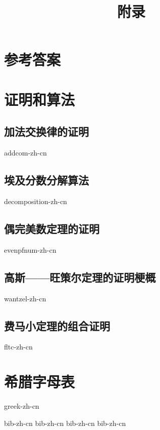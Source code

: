 \documentclass[b5paper]{ctexart}
\begin{document}
\title{附录}

\maketitle
\fi

\chapter{参考答案}
\label{ch:answers}
\shipoutAnswer

\chapter{证明和算法}

\section{加法交换律的证明}
{addcom-zh-cn}

\section{埃及分数分解算法}
{decomposition-zh-cn}

\section{偶完美数定理的证明}
{evenpfnum-zh-cn}

\section{高斯——旺策尔定理的证明梗概}
{wantzel-zh-cn}

\section{费马小定理的组合证明}
{fltc-zh-cn}

\chapter{希腊字母表} \label{ch:greek-letters}
{greek-zh-cn}

\markboth{\bibname}{}

\begin{thebibliography}{99}
  {bib-zh-cn}
  {bib-zh-cn}
  {bib-zh-cn}
  {bib-zh-cn}
\end{thebibliography}

\ifx\wholebook\relax \else
\expandafter\enddocument
\fi
\end{document}
